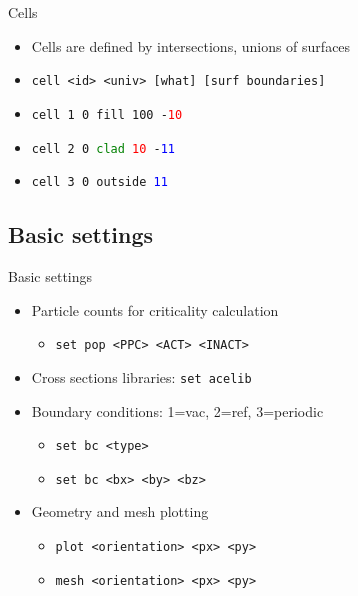 \documentclass{beamer}
\begin{document}
\begin{frame}{Cells}
    \begin{itemize}
        \item{Cells are defined by intersections, unions of surfaces}
        \item{\texttt{cell <id> <univ> [what] [surf boundaries]}}
        \item{\texttt{cell 1 0 fill 100 -\textcolor{red}{10}}}
        \item{\texttt{cell 2 0 \textcolor{green}{clad} \textcolor{red}{10} -\textcolor{blue}{11}}}
        \item{\texttt{cell 3 0 outside \textcolor{blue}{11}}}
    \end{itemize}
    \begin{figure}
        \centering
    \end{figure}
\end{frame}

\subsection{Basic settings}

\begin{frame}{Basic settings}
    \begin{itemize}
        \item{Particle counts for criticality calculation}
        \begin{itemize}
            \item{\texttt{set pop <PPC> <ACT> <INACT>}}
        \end{itemize}
        \item{Cross sections libraries: \texttt{set acelib}}
        \item{Boundary conditions: 1=vac, 2=ref, 3=periodic}
            \begin{itemize}
                \item{\texttt{set bc <type>}}
                \item{\texttt{set bc <bx> <by> <bz>}}
            \end{itemize}
        \item{Geometry and mesh plotting}
            \begin{itemize}
                \item{\texttt{plot <orientation> <px> <py>}}
                \item{\texttt{mesh <orientation> <px> <py>}}
            \end{itemize}
    \end{itemize}
\end{frame}
\end{document}
